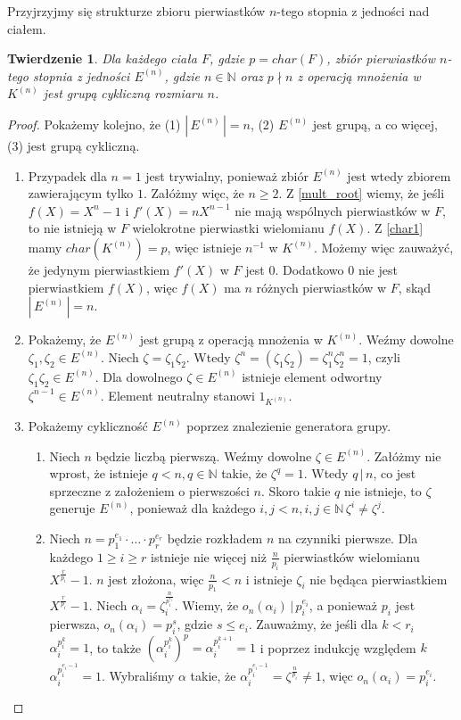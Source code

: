 \documentclass[declaration,shortabstract]{iithesis}
\theoremstyle{definition}
\theoremstyle{remark} \newtheorem{observation}{Obserwacja}
\theoremstyle{plain} \newtheorem{theorem}{Twierdzenie}
\theoremstyle{plain} \newtheorem{lemma}{Lemat}
\theoremstyle{remark} \newtheorem*{remark*}{Uwaga}
\theoremstyle{reminder} \newtheorem*{reminder*}{Przypomnienie}
\begin{document}
Przyjrzyjmy się strukturze zbioru pierwiastków $n$-tego stopnia z jedności nad ciałem. 
	
\begin{theorem}
	Dla każdego ciała $F$, gdzie $p = char(F)$, zbiór pierwiastków $n$-tego stopnia z jedności $E^{(n)}$, gdzie $n \in \mathbb{N}$ oraz $p \nmid n$ z operacją mnożenia w $K^{(n)}$ jest grupą cykliczną rozmiaru $n$.
\end{theorem}
	
\begin{proof}
    Pokażemy kolejno, że (1) $|\,E^{(n)}\,| = n$, (2) $E^{(n)}$ jest grupą, a co więcej, (3) jest grupą cykliczną.
    \begin{enumerate}[label=(\arabic*),leftmargin=.4in]
        \item Przypadek dla $n = 1$ jest trywialny, ponieważ zbiór $E^{(n)}$ jest wtedy zbiorem zawierającym tylko $1$. Załóżmy więc, że $n \geq 2$. Z \ref{mult_root} wiemy, że jeśli $f(X) = X^n - 1$ i $f'(X) = nX^{n-1}$ nie mają wspólnych pierwiastków w $F$, to nie istnieją w $F$ wielokrotne pierwiastki wielomianu $f(X)$. Z \ref{char1} mamy $char(K^{(n)}) = p$, więc istnieje $n^{-1}$ w $K^{(n)}$. Możemy więc zauważyć, że jedynym pierwiastkiem $f'(X)$ w $F$ jest $0$. Dodatkowo $0$ nie jest pierwiastkiem $f(X)$, więc $f(X)$ ma $n$ różnych pierwiastków w $F$, skąd $|\,E^{(n)}\,| = n$.
        \item Pokażemy, że $E^{(n)}$ jest grupą z operacją mnożenia w $K^{(n)}$. Weźmy dowolne $\zeta_1, \zeta_2 \in E^{(n)}$. Niech $\zeta = \zeta_1 \zeta_2$. Wtedy $\zeta^n = (\zeta_1 \zeta_2) = \zeta_1^n \zeta_2^n = 1$, czyli $\zeta_1 \zeta_2 \in E^{(n)}$. Dla dowolnego $\zeta \in E^{(n)}$ istnieje element odwortny $\zeta^{n-1} \in E^{(n)}$. Element neutralny stanowi $1_{K^{(n)}}$.
        \item Pokażemy cykliczność $E^{(n)}$ poprzez znalezienie generatora grupy. 
        \begin{enumerate}[label=(3.\arabic*)]
            \item Niech $n$ będzie liczbą pierwszą. Weźmy dowolne $\zeta \in E^{(n)}$. Załóżmy nie wprost, że istnieje $q < n, q \in \mathbb{N}$ takie, że $\zeta^q = 1$. Wtedy $q \, | \, n$, co jest sprzeczne z założeniem o pierwszości $n$. Skoro takie $q$ nie istnieje, to $\zeta$ generuje $E^{(n)}$, ponieważ dla każdego $i, j < n, i, j \in \mathbb{N} \, \zeta^i \neq \zeta^j$.
            \item Niech $n = p_1^{e_1} \cdot \dots \cdot p_r^{e_r}$ będzie rozkładem $n$ na czynniki pierwsze. Dla każdego $1 \geq i \geq r$ istnieje nie więcej niż $\frac{n}{p_i}$ pierwiastków wielomianu $X^{\frac{r}{p_i}}-1$. $n$ jest złożona, więc $\frac{n}{p_1} < n$ i istnieje $\zeta_i$ nie będąca pierwiastkiem $X^{\frac{r}{p_i}} - 1$. Niech $\alpha_i = \zeta_i^{\frac{n}{p_i^{e_i}}}$. Wiemy, że $o_n(\alpha_i) \, | \, p_i^{e_i}$, a ponieważ $p_i$ jest pierwsza, $o_n(\alpha_i) = p_i^s$, gdzie $s \leq e_i$. Zauważmy, że jeśli dla $k < r_i$ $\alpha_i^{p_i^k} = 1$, to także $(\alpha_i^{p_i^k})^p = \alpha_i^{p_i^{k+1}} = 1$ i poprzez indukcję względem $k$ $\alpha_i^{p_i^{e_i-1}} = 1$. Wybraliśmy $\alpha$ takie, że $\alpha_i^{p_i^{e_i-1}} = \zeta^{\frac{n}{p_i}} \neq 1$, więc $o_n(\alpha_i) = p_i^{e_i}$. \newline

\end{enumerate}
\end{enumerate}
\end{proof}
\end{document}
